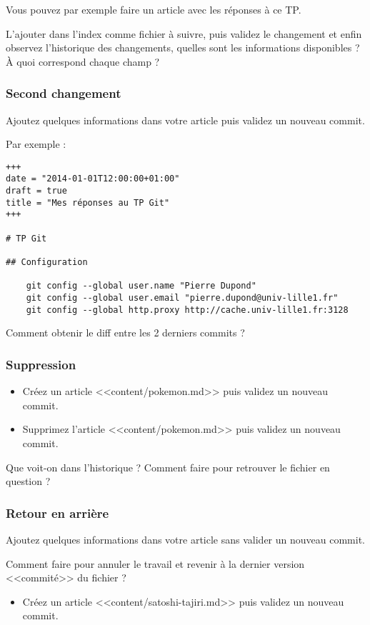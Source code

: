 \documentclass[a4paper]{article}
\newcounter{question}
\begin{document}
Vous pouvez par exemple faire un article avec les réponses à ce TP.

L'ajouter dans l'index comme fichier à suivre, puis validez le changement et enfin observez l'historique des changements, quelles sont les informations disponibles ? À quoi correspond chaque champ ?

\subsubsection{Second changement}
Ajoutez quelques informations dans votre article puis validez un nouveau commit.

Par exemple : 
\begin{verbatim}
+++
date = "2014-01-01T12:00:00+01:00"
draft = true
title = "Mes réponses au TP Git"
+++

# TP Git

## Configuration

    git config --global user.name "Pierre Dupond"
    git config --global user.email "pierre.dupond@univ-lille1.fr"
    git config --global http.proxy http://cache.univ-lille1.fr:3128

\end{verbatim}

Comment obtenir le diff entre les 2 derniers commits ?

\subsubsection{Suppression}
\begin{itemize}
\item Créez un article <<content/pokemon.md>> puis validez un nouveau commit. 
\item Supprimez l'article <<content/pokemon.md>> puis validez un nouveau commit. 
\end{itemize}

Que voit-on dans l'historique ?
Comment faire pour retrouver le fichier en question ?

\subsubsection{Retour en arrière}
Ajoutez quelques informations dans votre article sans valider un nouveau commit.

Comment faire pour annuler le travail et revenir à la dernier version <<commité>> du fichier ?

\begin{itemize}
  \item Créez un article <<content/satoshi-tajiri.md>> puis validez un nouveau commit.
\end{itemize}
\end{document}

